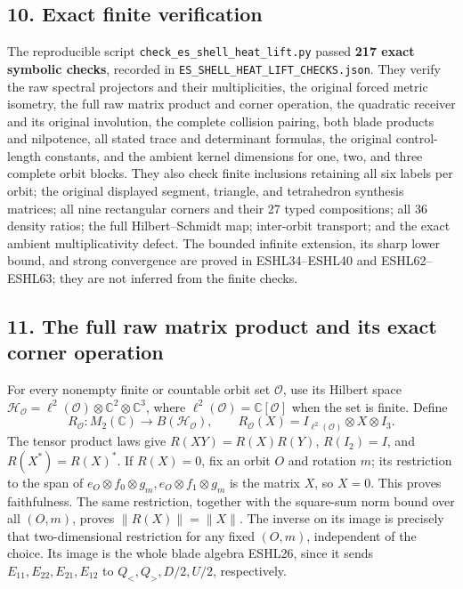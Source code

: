 \documentclass[
  10pt,
  a4paper,
]{article}
\newcounter{none} %
\begin{document}
\subsection{10. Exact finite
verification}\label{exact-finite-verification-1}

The reproducible script \texttt{check\_\allowbreak{}es\_\allowbreak{}shell\_\allowbreak{}heat\_\allowbreak{}lift.\allowbreak{}py} passed
\textbf{217 exact symbolic checks}, recorded in
\texttt{ES\_\allowbreak{}SHELL\_\allowbreak{}HEAT\_\allowbreak{}LIFT\_\allowbreak{}CHECKS.\allowbreak{}json}. They verify the raw
spectral projectors and their multiplicities, the original forced metric
isometry, the full raw matrix product and corner operation, the
quadratic receiver and its original involution, the complete collision
pairing, both blade products and nilpotence, all stated trace and
determinant formulas, the original control-length constants, and the
ambient kernel dimensions for one, two, and three complete orbit blocks.
They also check finite inclusions retaining all six labels per orbit;
the original displayed segment, triangle, and tetrahedron synthesis
matrices; all nine rectangular corners and their 27 typed compositions;
all 36 density ratios; the full Hilbert--Schmidt map; inter-orbit
transport; and the exact ambient multiplicativity defect. The bounded
infinite extension, its sharp lower bound, and strong convergence are
proved in ESHL34--ESHL40 and ESHL62--ESHL63; they are not inferred from
the finite checks.

\subsection{11. The full raw matrix product and its exact corner
operation}\label{the-full-raw-matrix-product-and-its-exact-corner-operation}

For every nonempty finite or countable orbit set \(\mathcal O\), use its
Hilbert space
\(\mathcal H_{\mathcal O}=\ell^2(\mathcal O)\otimes\mathbb C^2\otimes\mathbb C^3\),
where \(\ell^2(\mathcal O)=\mathbb C[\mathcal O]\) when the set is
finite. Define \[
R_{\mathcal O}:M_2(\mathbb C)\longrightarrow B(\mathcal H_{\mathcal O}),
\qquad R_{\mathcal O}(X)=I_{\ell^2(\mathcal O)}\otimes X\otimes I_3.
\tag{ESHL45}
\] The tensor product laws give \(R(XY)=R(X)R(Y)\), \(R(I_2)=I\), and
\(R(X^*)=R(X)^*\). If \(R(X)=0\), fix an orbit \(O\) and rotation \(m\);
its restriction to the span of
\(e_O\otimes f_0\otimes g_m,e_O\otimes f_1\otimes g_m\) is the matrix
\(X\), so \(X=0\). This proves faithfulness. The same restriction,
together with the square-sum norm bound over all \((O,m)\), proves
\(\|R(X)\|=\|X\|\). The inverse on its image is precisely that
two-dimensional restriction for any fixed \((O,m)\), independent of the
choice. Its image is the whole blade algebra ESHL26, since it sends
\(E_{11},E_{22},E_{21},E_{12}\) to \(Q_<,Q_>,D/2,U/2\), respectively.
\end{document}
